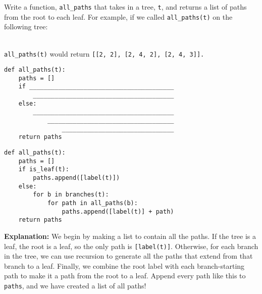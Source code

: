 \begin{blocksection}
\question Write a function, \lstinline$all_paths$ that takes in a tree, \lstinline$t$, and returns a list of paths from the root to each leaf.
For example, if we called \lstinline$all_paths(t)$ on the following tree:

\\\lstinline$all_paths(t)$ would return \lstinline$[[2, 2], [2, 4, 2], [2, 4, 3]].$
\newline

\begin{lstlisting}
def all_paths(t):
    paths = []
    if ________________________________________
        _______________________________________
    else:
        _______________________________________
            ___________________________________
                _______________________________
    return paths
\end{lstlisting}

\begin{solution}
\begin{lstlisting}
def all_paths(t):
    paths = []
    if is_leaf(t):
        paths.append([label(t)])
    else:
        for b in branches(t):
            for path in all_paths(b):
                paths.append([label(t)] + path)
    return paths
\end{lstlisting}

\textbf{Explanation:}
\newline
We begin by making a list to contain all the paths.
\newline
If the tree is a leaf, the root is a leaf, so the only path is \lstinline$[label(t)]$.
\newline
Otherwise, for each branch in the tree, we can use recursion to generate all the paths that extend from that branch to a leaf.
\newline
Finally, we combine the root label with each branch-starting path to make it a path from the root to a leaf.
\newline
Append every path like this to \lstinline$paths$, and we have created a list of all paths!
\end{solution}
\end{blocksection}

